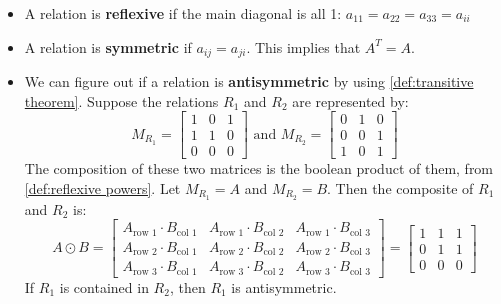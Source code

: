 \documentclass[article, 12pt]{article}
\theoremstyle{definition}
\begin{document}
    \begin{itemize}
        \item A relation is \textbf{reflexive} if the main diagonal is all 1: $a_{11} = a_{22} = a_{33} = a_{ii}$
        \item A relation is \textbf{symmetric} if $a_{ij} = a_{ji}$. This implies that $A^T = A$.
        \item We can figure out if a relation is \textbf{antisymmetric} by using \autoref{def:transitive theorem}. Suppose the relations $R_1$ and $R_2$ are represented by:
        \[ M_{R_1} = \begin{bmatrix}
            1 & 0 & 1 \\
            1 & 1 & 0 \\
            0 & 0 & 0
        \end{bmatrix} \text{ and } M_{R_2} = \begin{bmatrix}
            0 & 1 & 0 \\
            0 & 0 & 1 \\
            1 & 0 & 1
        \end{bmatrix}\]
        The composition of these two matrices is the boolean product of them, from \autoref{def:reflexive powers}. Let $M_{R_1} = A$ and $M_{R_2} = B$. Then the composite of $R_1$ and $R_2$ is:
        \[ A \odot B = \begin{bmatrix}
            A_{\text{row 1}} \cdot B_{\text{col 1}} & A_{\text{row 1}} \cdot B_{\text{col 2}} & A_{\text{row 1}} \cdot B_{\text{col 3}} \\
            A_{\text{row 2}} \cdot B_{\text{col 1}} & A_{\text{row 2}} \cdot B_{\text{col 2}} & A_{\text{row 2}} \cdot B_{\text{col 3}} \\
            A_{\text{row 3}} \cdot B_{\text{col 1}} & A_{\text{row 3}} \cdot B_{\text{col 2}} & A_{\text{row 3}} \cdot B_{\text{col 3}}
        \end{bmatrix} = \begin{bmatrix}
            1 & 1 & 1 \\
            0 & 1 & 1 \\
            0 & 0 & 0
        \end{bmatrix} \] 
        If $R_1$ is contained in $R_2$, then $R_1$ is antisymmetric.
    \end{itemize}
\end{document}
